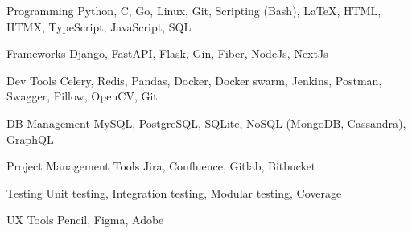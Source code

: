 
\begin{cvskills}

  \cvskill
    {Programming} %
    {Python, C, Go, Linux, Git, Scripting (Bash), LaTeX, HTML, HTMX, TypeScript, JavaScript, SQL}

  \cvskill
    {Frameworks} %
    {Django, FastAPI, Flask, Gin, Fiber, NodeJs, NextJs}

  \cvskill
    {Dev Tools} %
    {Celery, Redis, Pandas, Docker, Docker swarm, Jenkins, Postman, Swagger, Pillow, OpenCV, Git}

  \cvskill
    {DB Management} %
    {MySQL, PostgreSQL, SQLite, NoSQL (MongoDB, Cassandra), GraphQL}

  \cvskill
    {Project Management Tools} %
    {Jira, Confluence, Gitlab, Bitbucket}

  \cvskill
    {Testing} %
    {Unit testing, Integration testing, Modular testing, Coverage}

  \cvskill
    {UX Tools} %
    {Pencil, Figma, Adobe}

\end{cvskills}
